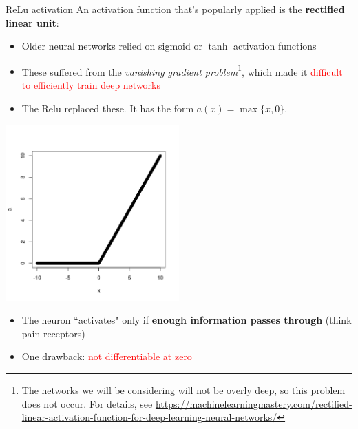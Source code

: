 \documentclass{beamer}
\begin{document}
\begin{frame}{ReLu activation}
An activation function that's popularly applied is the \textbf{rectified linear unit}:
\begin{itemize}
\item Older neural networks relied on sigmoid or $\tanh$ activation functions
\item These suffered from the \textit{vanishing gradient problem}\footnote{The networks we will be considering will not be overly deep, so this problem does not occur. For details, see \url{https://machinelearningmastery.com/rectified-linear-activation-function-for-deep-learning-neural-networks/}}, which made it \textcolor{red}{difficult to efficiently train deep networks}
\item The Relu replaced these. It has the form $a(x)=\max\{x,0\}$.
\end{itemize}
\begin{minipage}{0.49\linewidth}
\includegraphics[width=0.5\textwidth]{Images/ReLu.png}
\end{minipage}
\begin{minipage}{0.49\linewidth}
\begin{itemize}
\item The neuron ``activates" only if \textbf{enough information passes through} (think pain receptors)
\item One drawback: \textcolor{red}{not differentiable at zero}
\end{itemize}
\end{minipage}
\end{frame}
\end{document}
